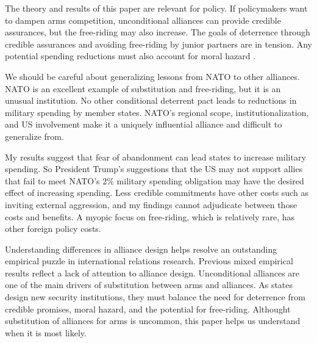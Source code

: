 \documentclass[12pt]{article}
\begin{document}
The theory and results of this paper are relevant for policy. If policymakers want to dampen arms competition, unconditional alliances can provide credible assurances, but the free-riding may also increase. The goals of deterrence through credible assurances and avoiding free-riding by junior partners are in tension. Any potential spending reductions must also account for moral hazard \citep{Benson2012}. 

We should be careful about generalizing lessons from NATO to other alliances. NATO is an excellent example of substitution and free-riding, but it is an unusual institution. No other conditional deterrent pact leads to reductions in military spending by member states. NATO's regional scope, institutionalization, and US involvement make it a uniquely influential alliance and difficult to generalize from. 

My results suggest that fear of abandonment can lead states to increase military spending. So President Trump's suggestions that the US may not support allies that fail to meet NATO's 2\% military spending obligation may have the desired effect of increasing spending. Less credible commitments have other costs such as inviting external aggression, and my findings cannot adjudicate between those costs and benefits. A myopic focus on free-riding, which is relatively rare, has other foreign policy costs. 

Understanding differences in alliance design helps resolve an outstanding empirical puzzle in international relations research. Previous mixed empirical results reflect a lack of attention to alliance design. Unconditional alliances are one of the main drivers of substitution between arms and alliances. As states design new security institutions, they must balance the need for deterrence from credible promises, moral hazard, and the potential for free-riding. Althought substitution of alliances for arms is uncommon, this paper helps us understand when it is most likely. 






%  
 
\end{document}
